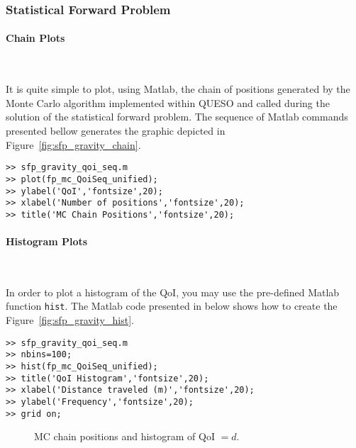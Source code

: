 \newpage

\subsubsection{Statistical Forward Problem}


\paragraph{Chain Plots} \

It is quite simple to plot, using Matlab, the chain of positions generated by the Monte Carlo algorithm 
implemented within QUESO and called during the solution of the statistical forward problem. 
The sequence of Matlab commands presented bellow generates the graphic depicted in 
Figure~\ref{fig:sfp_gravity_chain}. 

\begin{lstlisting}[label=matlab:chain_qoi,caption={Matlab code for the chain plot.}]
% inside Matlab
>> sfp_gravity_qoi_seq.m
>> plot(fp_mc_QoiSeq_unified);
>> ylabel('QoI','fontsize',20);
>> xlabel('Number of positions','fontsize',20);
>> title('MC Chain Positions','fontsize',20);
\end{lstlisting}


\paragraph{Histogram Plots} \

In order to plot a histogram of the QoI, you may use the pre-defined Matlab function \verb+hist+.
The Matlab code presented in below shows how to create the Figure~\ref{fig:sfp_gravity_hist}.

\begin{lstlisting}[label=matlab:hist_qoi,caption={Matlab code for the QoI histogram plot.}]
>> sfp_gravity_qoi_seq.m
>> nbins=100;
>> hist(fp_mc_QoiSeq_unified);
>> title('QoI Histogram','fontsize',20);
>> xlabel('Distance traveled (m)','fontsize',20);
>> ylabel('Frequency','fontsize',20);
>> grid on;
\end{lstlisting}

\begin{figure}[h]
\centering 
{}
\vspace{-6pt}
\caption{MC chain positions and histogram of QoI $=d$.}
\end{figure}

